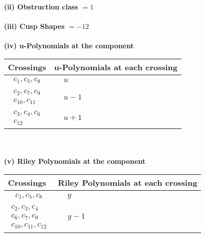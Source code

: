 \documentclass[1p]{elsarticle_modified}
\theoremstyle{definition}
\begin{document}
\flushleft \textbf{(ii) Obstruction class $= 1$}\\~\\
\flushleft \textbf{(iii) Cusp Shapes $= -12$}\\~\\
\newpage\renewcommand{\arraystretch}{1}
\flushleft \textbf{(iv) u-Polynomials at the component}\newline \\
\begin{tabular}{m{50pt}|m{274pt}}
Crossings & \hspace{64pt}u-Polynomials at each crossing \\
\hline $$\begin{aligned}c_{1},c_{5},c_{8}\end{aligned}$$&$\begin{aligned}
&u
\end{aligned}$\\
\hline $$\begin{aligned}c_{2},c_{7},c_{9}\\c_{10},c_{11}\end{aligned}$$&$\begin{aligned}
&u-1
\end{aligned}$\\
\hline $$\begin{aligned}c_{3},c_{4},c_{6}\\c_{12}\end{aligned}$$&$\begin{aligned}
&u+1
\end{aligned}$\\
\hline
\end{tabular}\\~\\
\newpage\renewcommand{\arraystretch}{1}
\flushleft \textbf{(v) Riley Polynomials at the component}\newline \\
\begin{tabular}{m{50pt}|m{274pt}}
Crossings & \hspace{64pt}Riley Polynomials at each crossing \\
\hline $$\begin{aligned}c_{1},c_{5},c_{8}\end{aligned}$$&$\begin{aligned}
&y
\end{aligned}$\\
\hline $$\begin{aligned}c_{2},c_{3},c_{4}\\c_{6},c_{7},c_{9}\\c_{10},c_{11},c_{12}\end{aligned}$$&$\begin{aligned}
&y-1
\end{aligned}$\\
\hline
\end{tabular}\\~\\
\end{document}
